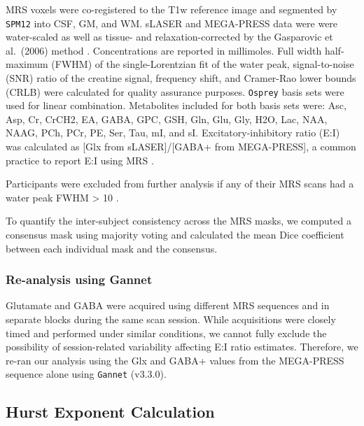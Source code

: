 \documentclass[
true
]{sn-jnl}
\begin{document}
MRS voxels were co-registered to the T1w reference image and segmented
by \texttt{SPM12} \citep{fristonStatisticalParametricMapping2007} into
CSF, GM, and WM. sLASER and MEGA-PRESS data were were water-scaled as
well as tissue- and relaxation-corrected by the Gasparovic et al.~(2006)
method \citep{gasparovicUseTissueWater2006}. Concentrations are reported
in millimoles. Full width half-maximum (FWHM) of the single-Lorentzian
fit of the water peak, signal-to-noise (SNR) ratio of the creatine
signal, frequency shift, and Cramer-Rao lower bounds (CRLB) were
calculated for quality assurance purposes. \texttt{Osprey} basis sets
were used for linear combination. Metabolites included for both basis
sets were: Asc, Asp, Cr, CrCH2, EA, GABA, GPC, GSH, Gln, Glu, Gly, H2O,
Lac, NAA, NAAG, PCh, PCr, PE, Ser, Tau, mI, and sI.
Excitatory-inhibitory ratio (E:I) was calculated as {[}Glx from
sLASER{]}/{[}GABA+ from MEGA-PRESS{]}, a common practice to report E:I
using MRS \citep{rideauxNoBalanceGlutamate+glutamine2021}.

Participants were excluded from further analysis if any of their MRS
scans had a water peak FWHM \textgreater{} 10
\citep{juchemB0ShimmingVivo2021}.

To quantify the inter-subject consistency across the MRS masks, we
computed a consensus mask using majority voting and calculated the mean
Dice coefficient between each individual mask and the consensus.

\subsubsection{Re-analysis using Gannet}\label{re-analysis-using-gannet}

Glutamate and GABA were acquired using different MRS sequences and in
separate blocks during the same scan session. While acquisitions were
closely timed and performed under similar conditions, we cannot fully
exclude the possibility of session-related variability affecting E:I
ratio estimates. Therefore, we re-ran our analysis using the Glx and
GABA+ values from the MEGA-PRESS sequence alone using \texttt{Gannet}
\citep{eddenGannetBatchprocessingTool2014} (v3.3.0).

\subsection{Hurst Exponent
Calculation}\label{hurst-exponent-calculation}
\end{document}
